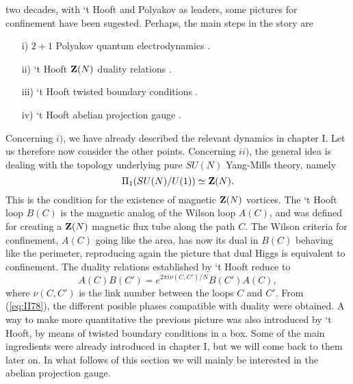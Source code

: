 two decades, with `t Hooft and Polyakov as leaders, some pictures
for confinement have been sugested. Perhaps, the main steps in
the story are
\begin{itemize}
	\item[{i)}] $2+1$ Polyakov quantum electrodynamics \cite{P3d}.
	\item[{ii)}] `t Hooft ${\bf Z}(N)$ duality relations \cite{tHconf}.
	\item[{iii)}] `t Hooft twisted boundary conditions \cite{tHtw}.
	\item[{iv)}] `t Hooft abelian projection gauge \cite{tHap}.
\end{itemize}
Concerning $i)$, we have already described the relevant dynamics in
chapter I. Let us therefore now consider 
the other points. Concerning $ii)$, the general idea is
dealing with the topology underlying pure $SU(N)$ Yang-Mills
theory, namely
\begin{equation}
\Pi_1(SU(N)/U(1)) \simeq {\bf Z}(N).
\label{eq:II78}
\end{equation}
This is the condition for the existence of magnetic 
${\bf Z}(N)$ vortices. The `t Hooft loop $B(C)$ is the magnetic
analog of the Wilson loop $A(C)$, and was defined for creating a
${\bf Z}(N)$ magnetic flux tube along the path $C$. The Wilson
criteria for confinement, $A(C)$ going like the area, has
now its dual in $B(C)$ behaving like the perimeter, reproducing
again the picture that dual Higgs is equivalent to confinement.
The duality relations established by `t Hooft reduce to 
\begin{equation}
A(C)B(C')=e^{2\pi i \nu(C,C')/N}B(C')A(C),
\label{eq:II79}
\end{equation}
where $\nu(C,C')$ is the link number between the loops $C$ and
$C'$. From (\ref{eq:II78}), the different posible phases
compatible with duality were obtained. A way to make more
quantitative the previous picture was also introduced by `t
Hooft, by means of twisted boundary conditions in a box. Some of 
the main ingredients were already introduced in chapter I, but we
will come back to them later on. In what follows of this section
we will mainly be interested in the abelian projection gauge.
  
